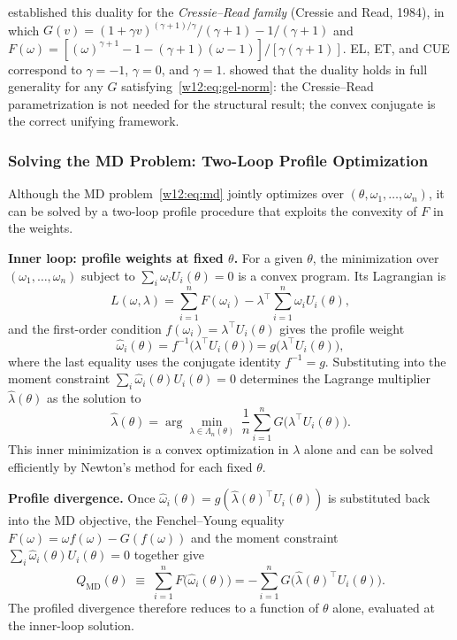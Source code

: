 \documentclass[master.tex]{subfiles}
\begin{document}
\citet{neweysmith2004} established this duality for the
\emph{Cressie--Read family} (Cressie and Read, 1984), in which
$G(v) = (1+\gamma v)^{(\gamma+1)/\gamma}/(\gamma+1) -
1/(\gamma+1)$ and $F(\omega) = [(\omega)^{\gamma+1} - 1 - (\gamma+1)
(\omega-1)]/[\gamma(\gamma+1)]$.  EL, ET, and CUE correspond to
$\gamma = -1$, $\gamma = 0$, and $\gamma = 1$.  \citet{ragusa2011}
showed that the duality holds in full generality for any $G$
satisfying~\eqref{w12:eq:gel-norm}: the Cressie--Read parametrization
is not needed for the structural result; the convex conjugate is the
correct unifying framework.

\subsubsection*{Solving the MD Problem: Two-Loop Profile Optimization}

Although the MD problem~\eqref{w12:eq:md} jointly optimizes over
$(\theta, \omega_1,\ldots,\omega_n)$, it can be solved by a
two-loop profile procedure that exploits the convexity of $F$ in
the weights.

\textbf{Inner loop: profile weights at fixed $\theta$.}  For a
given $\theta$, the minimization over $(\omega_1,\ldots,\omega_n)$
subject to $\sum_i \omega_i U_i(\theta) = 0$ is a convex program.
Its Lagrangian is
\[
  L(\omega, \lambda)
  = \sum_{i=1}^n F(\omega_i)
    - \lambda^\top \sum_{i=1}^n \omega_i U_i(\theta),
\]
and the first-order condition $f(\omega_i) = \lambda^\top
U_i(\theta)$ gives the profile weight
\[
  \hat\omega_i(\theta) = f^{-1}\!\bigl(\lambda^\top
  U_i(\theta)\bigr) = g\!\bigl(\lambda^\top U_i(\theta)\bigr),
\]
where the last equality uses the conjugate identity $f^{-1} = g$.
Substituting into the moment constraint $\sum_i \hat\omega_i(\theta)
U_i(\theta) = 0$ determines the Lagrange multiplier
$\hat\lambda(\theta)$ as the solution to
\begin{equation}
  \hat\lambda(\theta)
  = \arg\min_{\lambda \in \Lambda_n(\theta)}\;
    \frac{1}{n}\sum_{i=1}^n G\!\bigl(\lambda^\top U_i(\theta)\bigr).
  \label{w12:eq:gel-inner}
\end{equation}
This inner minimization is a convex optimization in $\lambda$ alone
and can be solved efficiently by Newton's method for each fixed
$\theta$.

\textbf{Profile divergence.}  Once $\hat\omega_i(\theta) =
g(\hat\lambda(\theta)^\top U_i(\theta))$ is substituted back into the
MD objective, the Fenchel--Young equality $F(\omega) = \omega
f(\omega) - G(f(\omega))$ and the moment constraint
$\sum_i \hat\omega_i(\theta) U_i(\theta) = 0$ together give
\begin{equation}
  Q_{\mathrm{MD}}(\theta)
  \;\equiv\;
  \sum_{i=1}^n F\!\bigl(\hat\omega_i(\theta)\bigr)
  = -\sum_{i=1}^n G\!\bigl(\hat\lambda(\theta)^\top U_i(\theta)\bigr).
  \label{w12:eq:md-profile}
\end{equation}
The profiled divergence therefore reduces to a function of $\theta$
alone, evaluated at the inner-loop solution.
\end{document}
